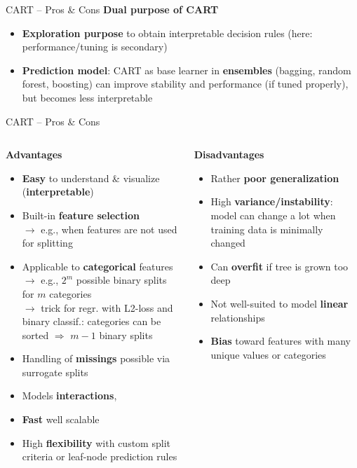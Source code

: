 \documentclass[11pt,compress,t,notes=noshow, xcolor=table]{beamer}
\newcommand{\highlight}[1]{\textcolor{hlcol}{\textbf{#1}}}
\newcommand{\positem}{\item[\textcolor{hlcol}{$\bm{+}$}]}
\newcommand{\negitem}{\item[\textcolor{hlcol}{$\bm{-}$}]}
\begin{document}
\begin{frame2}{CART -- Pros \& Cons}
  \highlight{Dual purpose of CART} ~~ 
\begin{itemize}
    \item \textbf{Exploration purpose} to obtain interpretable decision rules (here: performance/tuning is secondary)
    \item \textbf{Prediction model}: CART as base learner in \textbf{ensembles} (bagging, random forest, boosting) can improve stability and performance (if tuned properly), but becomes less interpretable
\end{itemize}

\end{frame2}

\begin{frame2}{CART -- Pros \& Cons}
\begin{columns}[onlytextwidth]
  \begin{column}{0.5\textwidth}
    \highlight{Advantages}
    \footnotesize
    \begin{itemize}
      \positem \textbf{Easy} to understand \& visualize (\textbf{interpretable})
      \positem Built-in \textbf{feature selection}\\
      $\rightarrow$ e.g., when features are not used for splitting
      \positem Applicable to \textbf{categorical} features \\
      $\rightarrow$ e.g., $2^m$ possible binary splits for $m$ categories\\
       $\rightarrow$ trick for regr. with L2-loss and binary classif.: categories can be sorted $\Rightarrow$ $m-1$ binary splits 
      \positem Handling of \textbf{missings} possible via surrogate splits
      \positem Models  \textbf{interactions}, 
      \positem \textbf{Fast} well scalable
      \positem High \textbf{flexibility} with custom split criteria or leaf-node 
      prediction rules
    \end{itemize}
  \end{column}
  \begin{column}{0.5\textwidth}
    \highlight{Disadvantages}
    \footnotesize
    \begin{itemize}
      \negitem Rather \textbf{poor generalization} %
      \negitem High \textbf{variance/instability}: model can change a lot when training data is minimally changed
      \negitem Can \textbf{overfit} if tree is grown too deep
      \negitem Not well-suited to model \textbf{linear} relationships
      \negitem \textbf{Bias} toward features with many unique values or categories
    \end{itemize}
  \end{column}
\end{columns}
\end{frame2}
\end{document}
